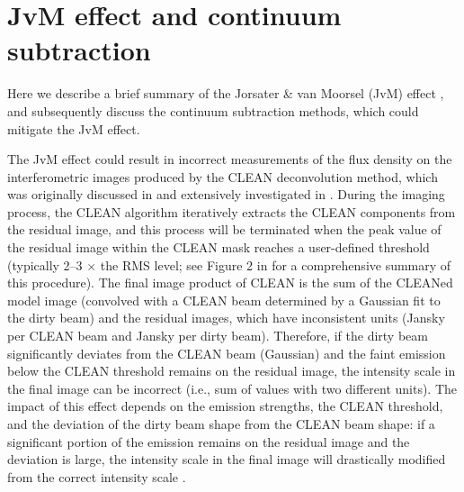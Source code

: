 \documentclass[linenumbers, twocolumn, twocolappendix, astrosymb, times]{aastex631}
\newcommand{\acetaldehyde}{CH$_3$CHO\xspace}
\newcommand{\methylformate}{CH$_3$OCHO\xspace}
\begin{document}
\begin{figure*}
\caption{Same as Figure \ref{fig:channelmap_CH3OH}, but for \acetaldehyde $5_{2,3}$ -- $4_{2,2}$ E $v_t=0$ transition.}
\label{fig:channelmap_CH3CHO}
\end{figure*}

\begin{figure*}
\caption{Same as Figure \ref{fig:channelmap_CH3OH}, but for \methylformate $8_{5,3}$ -- $7_{5,2}$ A $v_t=0$ transition.}
\label{fig:channelmap_CH3OCHO}
\end{figure*}



\section{JvM effect and continuum subtraction}\label{appendix:JvM_effect}
Here we describe a brief summary of the Jorsater \& van Moorsel (JvM) effect \citep{JvM, Czekala2021}, and subsequently discuss the continuum subtraction methods, which could mitigate the JvM effect.

The JvM effect could result in incorrect measurements of the flux density on the interferometric images produced by the CLEAN deconvolution method, which was originally discussed in \citet{JvM} and extensively investigated in \citet{Czekala2021}. During the imaging process, the CLEAN algorithm iteratively extracts the CLEAN components from the residual image, and this process will be terminated when the peak value of the residual image within the CLEAN mask reaches a user-defined threshold (typically 2--3 $\times$ the RMS level; see Figure 2 in \citet{Czekala2021} for a comprehensive summary of this procedure). The final image product of CLEAN is the sum of the CLEANed model image (convolved with a CLEAN beam determined by a Gaussian fit to the dirty beam) and the residual images, which have inconsistent units (Jansky per CLEAN beam and Jansky per dirty beam). Therefore, if the dirty beam significantly deviates from the CLEAN beam (Gaussian) and the faint emission below the CLEAN threshold remains on the residual image, the intensity scale in the final image can be incorrect (i.e., sum of values with two different units). The impact of this effect depends on the emission strengths, the CLEAN threshold, and the deviation of the dirty beam shape from the CLEAN beam shape: if a significant portion of the emission remains on the residual image and the deviation is large, the intensity scale in the final image will drastically modified from the correct intensity scale \citep{JvM, Czekala2021}.  
\end{document}
